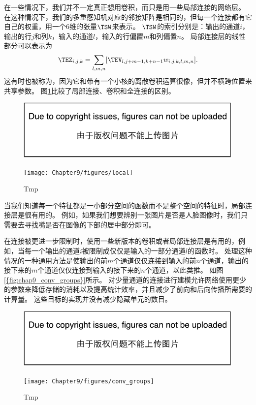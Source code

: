 在一些情况下，我们并不一定真正想用卷积，而只是用一些局部连接的网络层\citep{LeCun86,LeCun89a}。
在这种情况下，我们的多重感知机对应的邻接矩阵是相同的，但每一个连接都有它自己的权重，用一个6维的张量$\TSW$来表示。
$\TSW$的索引分别是：输出的通道$i$，输出的行$j$和列$k$，输入的通道$l$，输入的行偏置$m$和列偏置$n$。
局部连接层的线性部分可以表示为
\begin{equation}
\TEZ_{i,j,k} = \sum_{l,m,n} [\TEV_{l, j+m-1, k+n-1} w_{i, j, k, l, m, n}].
\end{equation}
这有时也被称为，因为它和带有一个小核的离散卷积运算很像，但并不横跨位置来共享参数。
图\ref{fig:chap9_local}比较了局部连接、卷积和全连接的区别。
\begin{figure}[!htb]
\ifOpenSource
\centerline{\includegraphics{figure.pdf}}
\else
\centerline{\texttt{[image: Chapter9/figures/local]}}
\fi
\caption{Tmp}
\label{fig:chap9_local}
\end{figure}
 
 
当我们知道每一个特征都是一小部分空间的函数而不是整个空间的特征时，局部连接层是很有用的。
例如，如果我们想要辨别一张图片是否是人脸图像时，我们只需要去寻找嘴是否在图像的下部的居中部分即可。

在连接被更进一步限制时，使用一些新版本的卷积或者局部连接层是有用的，例如，当每一个输出的通道$i$被限制成仅仅是输入的一部分通道$l$的函数时。
处理这种情况的一种通用方法是使输出的前$m$个通道仅仅连接到输入的前$n$个通道，输出的接下来的$m$个通道仅仅连接到输入的接下来的$n$个通道，以此类推。
如图\ref{{fig:chap9_conv_groups}}所示。
对少量通道的连接进行建模允许网络使用更少的参数来降低存储的消耗以及提高统计效率，并且减少了前向和后向传播所需要的计算量。
这些目标的实现并没有减少隐藏单元的数目。
\begin{figure}[!htb]
\ifOpenSource
\centerline{\includegraphics{figure.pdf}}
\else
\centerline{\texttt{[image: Chapter9/figures/conv\_groups]}}
\fi
\caption{Tmp}
\label{fig:chap9_conv_groups}
\end{figure}

